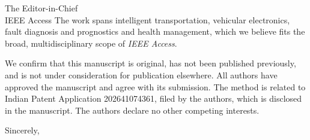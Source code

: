 \documentclass[11pt]{letter}
\begin{document}
\begin{letter}{The Editor-in-Chief\\IEEE Access}
The work spans intelligent transportation, vehicular electronics,
fault diagnosis and prognostics and health management, which we believe
fits the broad, multidisciplinary scope of \emph{IEEE Access}.

We confirm that this manuscript is original, has not been published
previously, and is not under consideration for publication elsewhere. All
authors have approved the manuscript and agree with its submission. The
method is related to Indian Patent Application 202641074361, filed by the
authors, which is disclosed in the manuscript. The authors declare no other
competing interests.

\closing{Sincerely,}
\end{letter}
\end{document}
